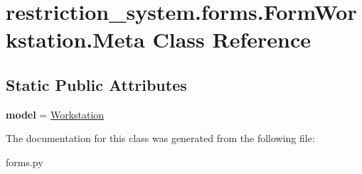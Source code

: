 \hypertarget{classrestriction__system_1_1forms_1_1FormWorkstation_1_1Meta}{}\section{restriction\+\_\+system.\+forms.\+Form\+Workstation.\+Meta Class Reference}
\label{classrestriction__system_1_1forms_1_1FormWorkstation_1_1Meta}
\subsection*{Static Public Attributes}
\begin{DoxyCompactItemize}
\item 
\hypertarget{classrestriction__system_1_1forms_1_1FormWorkstation_1_1Meta_aa1f77c3a77dffee71e65f9ca9c939b20}{}{\bfseries model} = \hyperlink{classrestriction__system_1_1models_1_1Workstation}{Workstation}\label{classrestriction__system_1_1forms_1_1FormWorkstation_1_1Meta_aa1f77c3a77dffee71e65f9ca9c939b20}

\end{DoxyCompactItemize}


The documentation for this class was generated from the following file\+:\begin{DoxyCompactItemize}
\item 
forms.\+py\end{DoxyCompactItemize}
